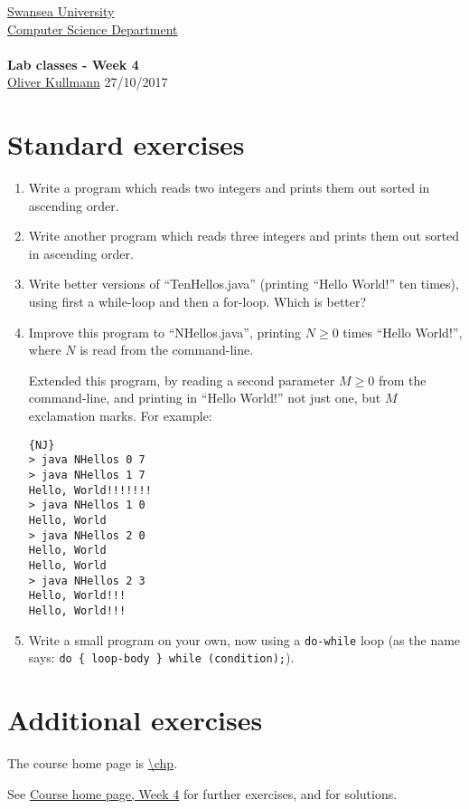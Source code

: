 \documentclass[11pt]{article}
\newcommand{\Java}{\lstset{language=Java,keywordstyle=\bfseries,breaklines,breakindent=30pt}}
\begin{document}
\begin{center}
  \href{http://www.swan.ac.uk/}{Swansea University}\\
  \href{http://www.swan.ac.uk/compsci/}{Computer Science Department}\\[1ex]
  \href{\chp}{\module}\\[1ex]
  \textbf{Lab classes - Week 4}\\
  \href{http://cs.swan.ac.uk/~csoliver}{Oliver Kullmann} 27/10/2017
\end{center}


\section{Standard exercises}
\label{sec:stdex}

\Java

\begin{enumerate}
\item Write a program which reads two integers and prints them out sorted in ascending order.
\item Write another program which reads three integers and prints them out sorted in ascending order.
\item Write better versions of ``TenHellos.java'' (printing ``Hello World!'' ten times), using first a while-loop and then a for-loop. Which is better?
\item Improve this program to ``NHellos.java'', printing $N \ge 0$ times ``Hello World!'', where $N$ is read from the command-line.

  Extended this program, by reading a second parameter $M \ge 0$ from the command-line, and printing in ``Hello World!'' not just one, but $M$ exclamation marks. For example:
  \begin{lstlisting}{NJ}
> java NHellos 0 7
> java NHellos 1 7
Hello, World!!!!!!!
> java NHellos 1 0
Hello, World
> java NHellos 2 0
Hello, World
Hello, World
> java NHellos 2 3
Hello, World!!!
Hello, World!!!
  \end{lstlisting}
\item Write a small program on your own, now using a \texttt{do-while} loop (as the name says: \texttt{do \{ loop-body \} while (condition);}).
\end{enumerate}


\section{Additional exercises}
\label{sec:addex}

The course home page is \url{\chp}.

See \href{\chp#ExercisesWeek04}{Course home page, Week 4} for further exercises, and for solutions.
\end{document}

